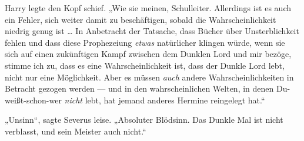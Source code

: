 Harry legte den Kopf schief.
„Wie sie meinen, Schulleiter. Allerdings ist es auch ein Fehler, sich weiter damit zu beschäftigen, sobald die Wahrscheinlichkeit niedrig genug ist … In Anbetracht der Tatsache, dass Bücher über Unsterblichkeit fehlen und dass diese Prophezeiung \emph{etwas} natürlicher klingen würde, wenn sie sich auf einen zukünftigen Kampf zwischen dem Dunklen Lord und mir bezöge, stimme ich zu, dass es eine Wahrscheinlichkeit ist, dass der Dunkle Lord lebt, nicht nur eine Möglichkeit. Aber es müssen \emph{auch} andere Wahrscheinlichkeiten in Betracht gezogen werden — und in den wahrscheinlichen Welten, in denen Du-weißt-schon-wer \emph{nicht} lebt, hat jemand anderes Hermine reingelegt hat.“

„Unsinn“, sagte Severus leise.
„Absoluter Blödsinn. Das Dunkle Mal ist nicht verblasst, und sein Meister auch nicht.“

